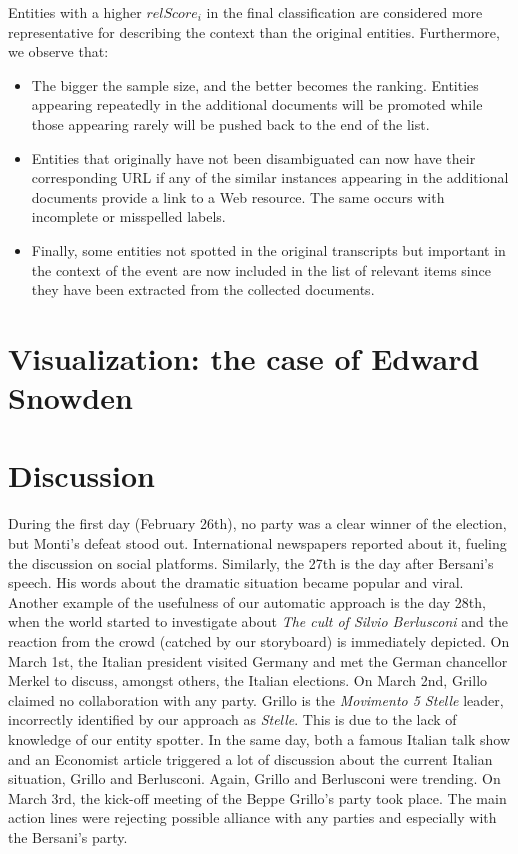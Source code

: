 \documentclass{llncs}
\begin{document}
Entities with a higher $relScore_{i}$ in the final classification are considered more representative for describing the context than the original entities. Furthermore, we observe that:
\begin{itemize}
  \item The bigger the sample size, and the better becomes the ranking. Entities appearing repeatedly in the additional documents will be promoted while those appearing rarely will be pushed back to the end of the list.
  \item Entities that originally have not been disambiguated can now have their corresponding URL if any of the similar instances appearing in the additional documents provide a link to a Web resource. The same occurs with incomplete or misspelled labels.
  \item Finally, some entities not spotted in the original transcripts but important in the context of the event are now included in the list of relevant items since they have been extracted from the collected documents.
\end{itemize}


\section{Visualization: the case of Edward Snowden}
\label{sec:usecase}


\section{Discussion}
\label{sec:discussion}
During the first day (February 26th), no party was a clear winner of the election, but Monti's defeat stood out. International newspapers reported about it, fueling the discussion on social platforms. Similarly, the 27th is the day after Bersani's speech. His words about the dramatic situation became popular and viral. Another example of the usefulness of our automatic approach is the day 28th, when the world started to investigate about \textit{The cult of Silvio Berlusconi} and the reaction from the crowd (catched by our storyboard) is immediately depicted. On March 1st, the Italian president visited Germany and met the German chancellor Merkel to discuss, amongst others, the Italian elections. On March 2nd, Grillo claimed no collaboration with any party. Grillo is the \textit{Movimento 5 Stelle} leader, incorrectly identified by our approach as \textit{Stelle}. This is due to the lack of knowledge of our entity spotter. In the same day, both a famous Italian talk show and an Economist article triggered a lot of discussion about the current Italian situation, Grillo and Berlusconi. Again, Grillo and Berlusconi were trending. On March 3rd, the kick-off meeting of the Beppe Grillo's party took place. The main action lines were rejecting possible alliance with any parties and especially with the Bersani's party.
\end{document}
